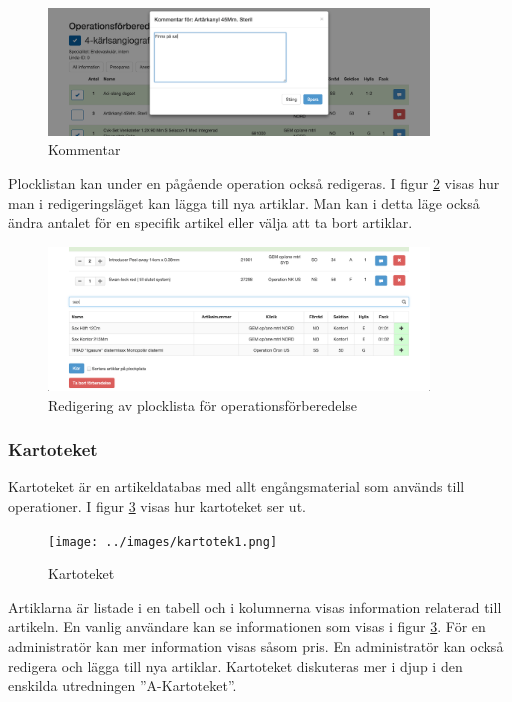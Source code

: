 \begin{figure}[H]
  \centering
  \includegraphics[width=0.9\textwidth]{images/site/kommentar}
  \caption{Kommentar}
  \label{fig:kommentar}
\end{figure}

Plocklistan kan under en pågående operation också redigeras. I figur \ref{fig:plocklistaredigering} visas hur man i redigeringsläget kan lägga till nya artiklar. Man kan i detta läge också ändra antalet för en specifik artikel eller välja att ta bort artiklar.

\begin{figure}[H]
  \centering
  \includegraphics[width=0.9\textwidth]{images/site/plocklistaredigering}
  \caption{Redigering av plocklista för operationsförberedelse}
  \label{fig:plocklistaredigering}
\end{figure}

\subsubsection{Kartoteket}
Kartoteket är en artikeldatabas med allt engångsmaterial som används till operationer. I figur \ref{fig:kartoteket} visas hur kartoteket ser ut. 

\begin{figure}[H]
  \centering
  \texttt{[image: ../images/kartotek1.png]}
  \caption{Kartoteket}
  \label{fig:kartoteket}
\end{figure}

Artiklarna är listade i en tabell och i kolumnerna visas information relaterad till artikeln. En vanlig användare kan se informationen som visas i figur \ref{fig:kartoteket}. För en administratör kan mer information visas såsom pris. En administratör kan också redigera och lägga till nya artiklar. Kartoteket diskuteras mer i djup i den enskilda utredningen ''A-Kartoteket''.%

